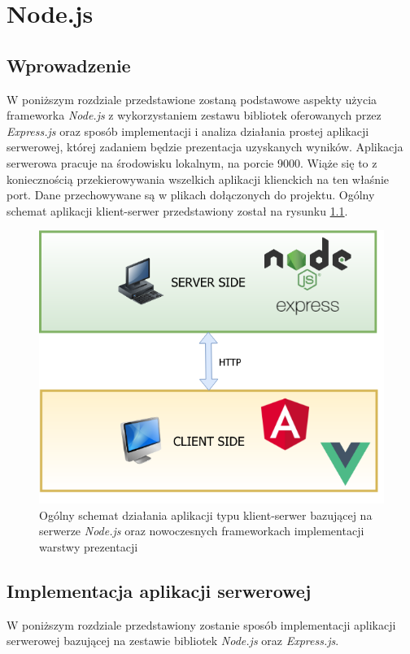 \chapter{Node.js}

\section{Wprowadzenie}
W poniższym rozdziale przedstawione zostaną podstawowe aspekty użycia frameworka \textit{Node.js} z wykorzystaniem zestawu bibliotek oferowanych przez \textit{Express.js} oraz sposób implementacji i analiza działania prostej aplikacji serwerowej, której zadaniem będzie prezentacja uzyskanych wyników. Aplikacja serwerowa pracuje na środowisku lokalnym, na porcie 9000. Wiąże się to z koniecznością przekierowywania wszelkich aplikacji klienckich na ten właśnie port. Dane przechowywane są w plikach dołączonych do projektu. Ogólny schemat aplikacji klient-serwer przedstawiony został na rysunku \ref{Rys:nodejs}.

\begin{figure}[h]
	\centering\includegraphics[scale=0.5]{images/nodejs.png}
	\caption{Ogólny schemat działania aplikacji typu klient-serwer bazującej na serwerze \textit{Node.js} oraz nowoczesnych frameworkach implementacji warstwy prezentacji}
	\label{Rys:nodejs}
\end{figure}

\section{Implementacja aplikacji serwerowej}
W poniższym rozdziale przedstawiony zostanie sposób implementacji aplikacji serwerowej bazującej na zestawie bibliotek \textit{Node.js} oraz \textit{Express.js}.

